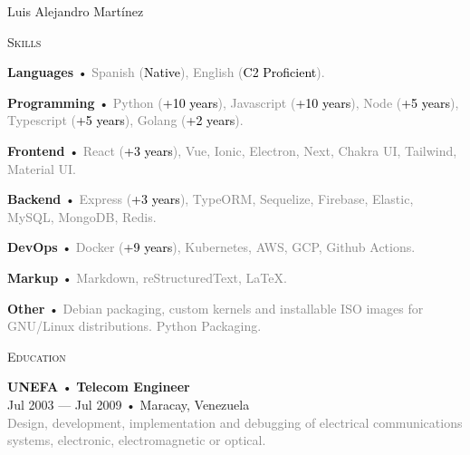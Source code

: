 \documentclass[12pt]{article}
\begin{document}
\begin{cv}{Luis Alejandro Mart\'inez}
\begin{minipage}[t]{0.35\textwidth}
    \vspace{0.25em}
    \begin{minipage}{\linewidth}
      \textrm{\textsc{\Large{Skills}}}
      \newline
      \parbox[t]{\linewidth}{
        \textbf{Languages} • \footnotesize{\textcolor{gray}{Spanish (\textcolor{black}{Native}), English (\textcolor{black}{C2 Proficient}).}}
      }
      \parbox[t]{\linewidth}{
        \textbf{Programming} • \footnotesize{\textcolor{gray}{Python (\textcolor{black}{+10 years}), Javascript (\textcolor{black}{+10 years}), Node (\textcolor{black}{+5 years}), Typescript (\textcolor{black}{+5 years}), Golang (\textcolor{black}{+2 years}).}}
      }
      \parbox[t]{\linewidth}{
        \textbf{Frontend} • \footnotesize{\textcolor{gray}{React (\textcolor{black}{+3 years}), Vue, Ionic, Electron, Next, Chakra UI, Tailwind, Material UI.}}
      }
      \parbox[t]{\linewidth}{
        \textbf{Backend} • \footnotesize{\textcolor{gray}{Express (\textcolor{black}{+3 years}), TypeORM, Sequelize, Firebase, Elastic, MySQL, MongoDB, Redis.}}
      }
      \parbox[t]{\linewidth}{
        \textbf{DevOps} • \footnotesize{\textcolor{gray}{Docker (\textcolor{black}{+9 years}), Kubernetes, AWS, GCP, Github Actions.}}
      }
      \parbox[t]{\linewidth}{
        \textbf{Markup} • \footnotesize{\textcolor{gray}{Markdown, reStructuredText, \LaTeX.}}
      }
      \parbox[t]{\linewidth}{
        \textbf{Other} • \footnotesize{\textcolor{gray}{Debian packaging, custom kernels and installable ISO images for GNU/Linux distributions. Python Packaging.}}
      }
      \newline
      \newline
    \end{minipage}

    \begin{minipage}{\linewidth}
      \textrm{\textsc{\Large{Education}}}
      \newline
      \parbox[t]{\linewidth}{
        \textbf{UNEFA} • \textrm{\textbf{Telecom Engineer}}\\
        Jul 2003 --- Jul 2009 • Maracay, Venezuela\\
        \footnotesize{\textcolor{gray}{Design, development, implementation and debugging of electrical communications systems, electronic, electromagnetic or optical.}}\\
      }
      \newline
    \end{minipage}


\end{minipage}
\end{cv}
\end{document}

